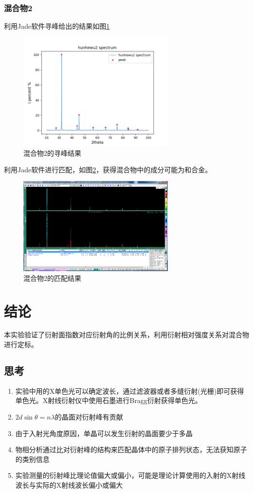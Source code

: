 \documentclass[10pt]{ctexart}
\begin{document}
\subsubsection{混合物2}
利用Jade软件寻峰给出的结果如图\ref{fig:hunhewu2}
\begin{figure}
    \centering
    \includegraphics[width=0.7\textwidth]{data/hunhewu2/spectrum.png}
    \caption{混合物2的寻峰结果}
    \label{fig:hunhewu2}
\end{figure}
利用Jade软件进行匹配，如图\ref{fig:hunhewu2Match}，获得混合物中的成分可能为和合金。
\begin{figure}
    \centering
    \includegraphics[width=0.7\textwidth]{data/hunhewu2/2.png}
    \caption{混合物2的匹配结果}
    \label{fig:hunhewu2Match}
\end{figure}
\section{结论}
本实验验证了衍射面指数对应衍射角的比例关系，利用衍射相对强度关系对混合物进行定标。
\subsection{思考}
\begin{enumerate}
    \item 实验中用的X单色光可以确定波长，通过滤波器或者多缝衍射(光栅)即可获得单色光。X射线衍射仪中使用石墨进行Bragg衍射获得单色光。
    \item $2d\sin{\theta}=n\lambda$的晶面对衍射峰有贡献
    \item 由于入射光角度原因，单晶可以发生衍射的晶面要少于多晶
    \item 物相分析通过比对衍射峰的结构来匹配晶体中的原子排列状态，无法获知原子的类别信息
    \item 实验测量的衍射峰比理论值偏大或偏小，可能是理论计算使用的入射的X射线波长与实际的X射线波长偏小或偏大
\end{enumerate}

\end{document}
